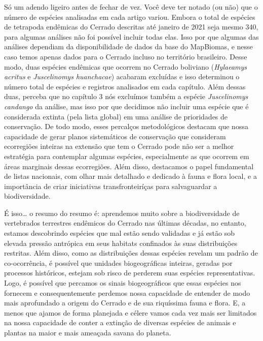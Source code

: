 \documentclass[12pt,openright,oneside,a4paper,english]{abntex2}
\begin{document}
Só um adendo ligeiro antes de fechar de vez. Você deve ter notado (ou não) que o número de espécies analisadas em cada artigo variou. Embora o total de espécies de tetrapoda endêmicas do Cerrado descritas até janeiro de 2021 seja mesmo 340, para algumas análises não foi possível incluir todas elas. Isso por que algumas das análises dependiam da disponibilidade de dados da base do MapBiomas, e nesse caso temos apenas dados para o Cerrado incluso no território brasileiro. Desse modo, duas espécies endêmicas que ocorrem no Cerrado boliviano (\textit{Hylaeamys acritus} e \textit{Juscelinomys huanchacae}) acabaram excluídas e isso determinou o número total de espécies e registros analisados em cada capítulo. Além dessas duas, perceba que no capítulo 3 nós excluímos também a espécie \textit{Juscelinomys candango} da análise, mas isso por que decidimos não incluir uma espécie que é considerada extinta (pela lista global) em uma análise de prioridades de conservação. De todo modo, esses percalços metodológicos destacam que nossa capacidade de gerar planos sistemáticos de conservação que consideram ecorregiões inteiras na extensão que tem o Cerrado pode não ser a melhor estratégia para contemplar algumas espécies, especialmente as que ocorrem em áreas marginais dessas ecorregiões. Além disso, destacamos o papel fundamental de listas nacionais, com olhar mais detalhado e dedicado à fauna e flora local, e a importância de criar iniciativas transfronteiríças para salvaguardar a biodiversidade.

É isso… o resumo do resumo é: aprendemos muito sobre a biodiversidade de vertebrados terrestres endêmicos do Cerrado nas últimas décadas, no entanto, estamos descobrindo espécies que mal estão sendo validadas e já estão sob elevada pressão antrópica em seus habitats confinados às suas distribuições restritas. Além disso, como as distribuições dessas espécies revelam um padrão de co-ocorrência, é possível que unidades biogeográficas inteiras, geradas por processos históricos, estejam sob risco de perderem suas espécies representativas. Logo, é possível que percamos os sinais biogeográficos que essas espécies nos fornecem e consequentemente perdemos nossa capacidade de entender de modo mais aprofundado a origem do Cerrado e de sua riquíssima fauna e flora. E, a menos que ajamos de forma planejada e célere vamos cada vez mais ser limitados na nossa capacidade de conter a extinção de diversas espécies de animais e plantas na maior e mais ameaçada savana do planeta. 


\end{document}

